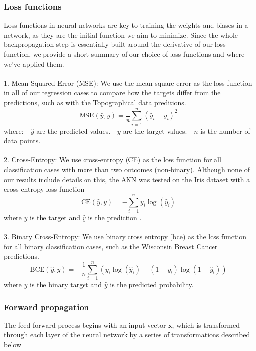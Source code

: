 \subsubsection{Loss functions}\label{sssec:loss_functions}
Loss functions in neural networks are key to training the weights and biases in a network, as they are the 
initial function we aim to minimize. 
Since the whole backpropagation step is essentially built around the derivative of our loss function,
we provide a short summary of our choice of 
loss functions and where we've applied them. 
\\
\\
1. Mean Squared Error (MSE):
We use the mean square error as the loss function in all of our regression cases to compare how the targets differ from the predictions, such
as with the Topographical data preditions. 
   \[
   \text{MSE}(\hat{y}, y) = \frac{1}{n} \sum_{i=1}^{n} (\hat{y}_i - y_i)^2
   \]
   where:
   - \( \hat{y} \) are the predicted values.
   - \( y \) are the target values.
   - \( n \) is the number of data points.
\\
\\
2. Cross-Entropy:
We use cross-entropy (CE) as the loss function for all classification cases with more than two outcomes (non-binary). Although none of our results include
details on this, the ANN was tested on the Iris dataset with a cross-entropy loss function. 
   \[
   \text{CE}(\hat{y}, y) = -\sum_{i=1}^{n} y_i \log(\hat{y}_i)
   \]
   where \( y \) is the target and \( \hat{y} \) is the prediction .
\\
\\
3. Binary Cross-Entropy:
We use binary cross entropy (bce) as the loss function for all binary classification cases, such as the Wisconsin Breast Cancer predictions. 
   \[
   \text{BCE}(\hat{y}, y) = -\frac{1}{n} \sum_{i=1}^{n} \left( y_i \log(\hat{y}_i) + (1 - y_i) \log(1 - \hat{y}_i) \right)
   \]
%
where \( y \) is the binary target and \( \hat{y} \) is the predicted probability.
\\

\subsubsection{Forward propagation}\label{sssec:forward_propagation}


The feed-forward process begins with an input vector \( \mathbf{x} \), which is transformed through each layer 
of the neural network by a series of transformations described below

